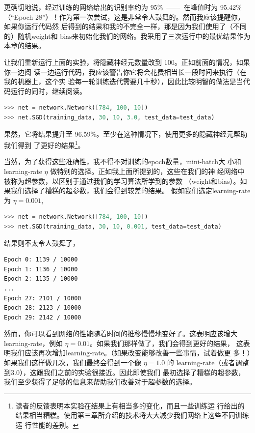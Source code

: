 更确切地说，经过训练的网络给出的识别率约为 95\%~——~在峰值时为 95.42\%（“Epoch
  28”）！作为第一次尝试，这是非常令人鼓舞的。然而我应该提醒你，如果你运行代码然
后得到的结果和我的不完全一样，那是因为我们使用了（不同的）随机\gls*{weight}和
\gls*{bias}来初始化我们的网络。我采用了三次运行中的最优结果作为本章的结果。

让我们重新运行上面的实验，将隐藏神经元数量改到 100。正如前面的情况，如果你一边阅
读一边运行代码，我应该警告你它将会花费相当长一段时间来执行（在我的机器上，这个实
  验每一轮训练迭代需要几十秒），因此比较明智的做法是当代码运行的同时，继续阅读。

\begin{lstlisting}[language=Python]
>>> net = network.Network([784, 100, 10])
>>> net.SGD(training_data, 30, 10, 3.0, test_data=test_data)
\end{lstlisting}

果然，它将结果提升至 96.59\%。至少在这种情况下，使用更多的隐藏神经元帮助我们得到
了更好的结果\footnote{读者的反馈表明本实验在结果上有相当多的变化，而且一些训练运
  行给出的结果相当糟糕。使用第三章所介绍的技术将大大减少我们网络上这些不同训练运
  行性能的差别。}。

当然，为了获得这些准确性，我不得不对训练的\gls*{epoch}数量，\gls*{mini-batch}大
小和\gls*{learning-rate} $\eta$ 做特别的选择。正如我上面所提到的，这些在我们的神
经网络中被称为超参数，以区别于通过我们的学习算法所学到的参数
（\gls*{weight}和\gls*{bias}）。如果我们选择了糟糕的超参数，我们会得到较差的结果。
假如我们选定\gls*{learning-rate}为 $\eta = 0.001$,

\begin{lstlisting}[language=Python]
>>> net = network.Network([784, 100, 10])
>>> net.SGD(training_data, 30, 10, 0.001, test_data=test_data)
\end{lstlisting}

结果则不太令人鼓舞了，

\begin{lstlisting}[language=sh]
Epoch 0: 1139 / 10000
Epoch 1: 1136 / 10000
Epoch 2: 1135 / 10000
...
Epoch 27: 2101 / 10000
Epoch 28: 2123 / 10000
Epoch 29: 2142 / 10000
\end{lstlisting}

然而，你可以看到网络的性能随着时间的推移慢慢地变好了。这表明应该增大
\gls*{learning-rate}，例如 $\eta = 0.01$。如果我们那样做了，我们会得到更好的结果，
这表明我们应该再次增加\gls*{learning-rate}。（如果改变能够改善一些事情，试着做更
  多！）如果我们这样做几次，我们最终会得到一个像 $\eta = 1.0$ 的%
\gls*{learning-rate}（或者调整到$3.0$），这跟我们之前的实验很接近。因此即使我们
最初选择了糟糕的超参数，我们至少获得了足够的信息来帮助我们改善对于超参数的选择。

